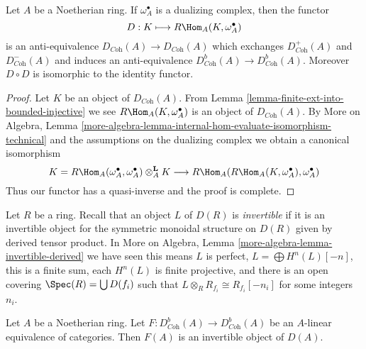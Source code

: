 \begin{lemma}
\label{lemma-dualizing}
Let $A$ be a Noetherian ring. If $\omega_A^\bullet$ is a dualizing
complex, then the functor
$$
D : K \longmapsto R\Hom_A(K, \omega_A^\bullet)
$$
is an anti-equivalence $D_{\textit{Coh}}(A) \to D_{\textit{Coh}}(A)$
which exchanges $D^+_{\textit{Coh}}(A)$ and $D^-_{\textit{Coh}}(A)$
and induces an anti-equivalence
$D^b_{\textit{Coh}}(A) \to D^b_{\textit{Coh}}(A)$.
Moreover $D \circ D$ is isomorphic to the identity functor.
\end{lemma}

\begin{proof}
Let $K$ be an object of $D_{\textit{Coh}}(A)$. From
Lemma \ref{lemma-finite-ext-into-bounded-injective}
we see $R\Hom_A(K, \omega_A^\bullet)$ is an object of $D_{\textit{Coh}}(A)$.
By More on Algebra, Lemma
\ref{more-algebra-lemma-internal-hom-evaluate-isomorphism-technical}
and the assumptions on the dualizing complex
we obtain a canonical isomorphism
$$
K = R\Hom_A(\omega_A^\bullet, \omega_A^\bullet) \otimes_A^\mathbf{L} K
\longrightarrow
R\Hom_A(R\Hom_A(K, \omega_A^\bullet), \omega_A^\bullet)
$$
Thus our functor has a quasi-inverse and the proof is complete.
\end{proof}

\noindent
Let $R$ be a ring. Recall that an object $L$ of $D(R)$ is
{\it invertible} if it is an invertible object for the
symmetric monoidal structure on $D(R)$ given by derived
tensor product. In
More on Algebra, Lemma \ref{more-algebra-lemma-invertible-derived}
we have seen this means $L$ is perfect, $L = \bigoplus H^n(L)[-n]$,
this is a finite sum, each $H^n(L)$ is finite projective,
and there is an open covering $\Spec(R) = \bigcup D(f_i)$ such that
$L \otimes_R R_{f_i} \cong R_{f_i}[-n_i]$ for some integers $n_i$.

\begin{lemma}
\label{lemma-equivalence-comes-from-invertible}
Let $A$ be a Noetherian ring. Let
$F : D^b_{\textit{Coh}}(A) \to D^b_{\textit{Coh}}(A)$ be an $A$-linear
equivalence of categories. Then $F(A)$ is an invertible object of $D(A)$.
\end{lemma}

